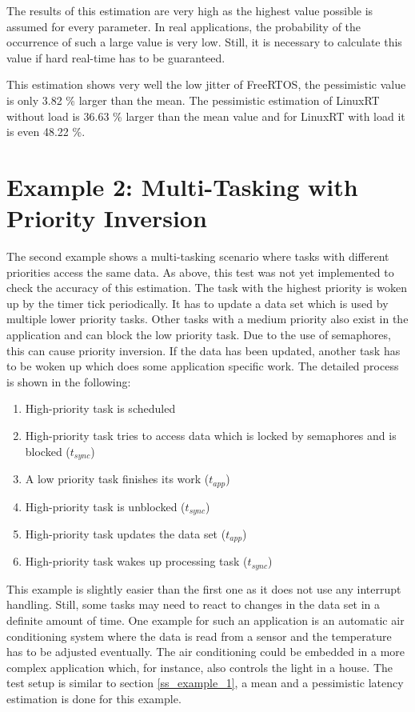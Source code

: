 The results of this estimation are very high as the highest value possible is assumed for every parameter. 
In real applications, the probability of the occurrence of such a large value is very low.
Still, it is necessary to calculate this value if hard real-time has to be guaranteed.    
\par
This estimation shows very well the low jitter of FreeRTOS, the pessimistic value is only 3.82 \% larger than the mean.
The pessimistic estimation of LinuxRT without load is 36.63 \% larger than the mean value and for LinuxRT with load it is even 48.22 \%. 

\section{Example 2: Multi-Tasking with Priority Inversion}
The second example shows a multi-tasking scenario where tasks with different priorities access the same data.
As above, this test was not yet implemented to check the accuracy of this estimation.
The task with the highest priority is woken up by the timer tick periodically. 
It has to update a data set which is used by multiple lower priority tasks. 
Other tasks with a medium priority also exist in the application and can block the low priority task.
Due to the use of semaphores, this can cause priority inversion.
If the data has been updated, another task has to be woken up which does some application specific work.
The detailed process is shown in the following:
\begin{enumerate}
	\item High-priority task is scheduled
	\item	High-priority task tries to access data which is locked by semaphores and is blocked ($t_{sync}$)
	\item A low priority task finishes its work ($t_{app}$)
	\item High-priority task is unblocked ($t_{sync}$)
	\item High-priority task updates the data set ($t_{app}$)
	\item High-priority task wakes up processing task ($t_{sync}$)
\end{enumerate}
This example is slightly easier than the first one as it does not use any interrupt handling. 
Still, some tasks may need to react to changes in the data set in a definite amount of time.
One example for such an application is an automatic air conditioning system where the data is read from a sensor and the temperature has to be adjusted eventually. 
The air conditioning could be embedded in a more complex application which, for instance, also controls the light in a house.
The test setup is similar to section \ref{ss_example_1}, a mean and a pessimistic latency estimation is done for this example. 

